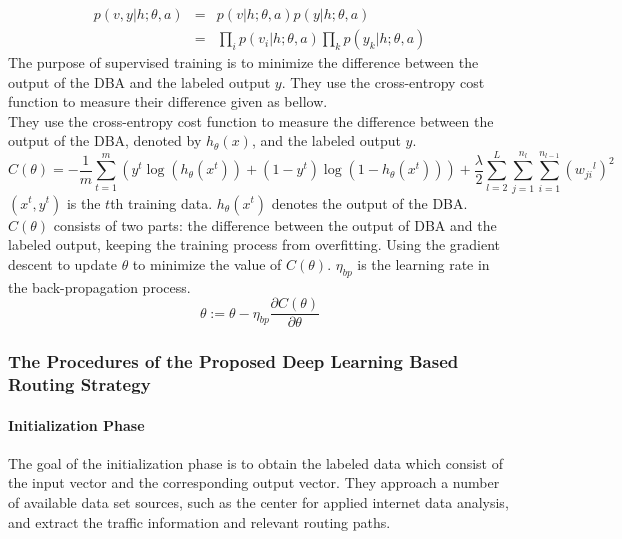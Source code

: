 \documentclass[11pt]{report}
\begin{document}
	\begin{eqnarray}
	p\left(v,y|h;\theta,a\right) &=& p\left(v|h;\theta,a\right)p\left(y|h;\theta,a\right)\\
	&=&\prod_{i}p\left(v_i|h;\theta,a\right)\prod_{k}p\left(y_k|h;\theta,a\right)
	\end{eqnarray}
	The purpose of supervised training is to minimize the difference between the output of the DBA and the labeled output $y$. They use the cross-entropy cost function to measure their difference given as bellow.\\
	They use the cross-entropy cost function to measure the difference between the output of the DBA, denoted by $h_\theta\left(x\right)$, and the labeled output $y$.
	\begin{equation}
	C\left(\theta\right)=-\frac{1}{m}\sum_{t=1}^{m}\left(y^t\log\left(h_\theta\left(x^t\right)\right)+\left(1-y^t\right)\log\left(1-h_\theta\left(x^t\right)\right)\right)+\frac{\lambda}{2}\sum_{l=2}^{L}\sum_{j=1}^{n_l}\sum_{i=1}^{n_{l-1}}\left({w_{ji}}^l\right)^2
	\end{equation}
	$\left(x^t,y^t\right)$ is the $t$th training data. $h_\theta\left(x^t\right)$ denotes the output of the DBA. $C\left(\theta\right)$ consists of two parts: the difference between the output of DBA and the labeled output, keeping the training process from overfitting. Using the gradient descent to update $\theta$ to minimize the value of $C\left(\theta\right)$. $\eta_{bp}$ is the learning rate in the back-propagation process.
	\begin{equation}
	\theta:=\theta-\eta_{bp}\frac{\partial C\left(\theta\right)}{\partial\theta}
	\end{equation}
	
	\subsubsection{The Procedures of the Proposed Deep Learning Based Routing Strategy}
	\paragraph{Initialization Phase}
	The goal of the initialization phase is to obtain the labeled data which consist of the input vector and the corresponding output vector. They approach a number of available data set sources, such as the center for applied internet data analysis, and extract the traffic information and relevant routing paths.
\end{document}
